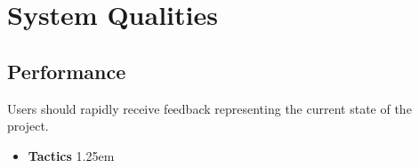 \documentclass{article}
\newcommand{\indentsize}{1.25em}
\newcommand{\pbodyitem}[2]{
    \item \textbf{{#1}} {
    \parindent \indentsize \newline {#2}
}
}
\begin{document}
\section{System Qualities}{
  \label{sec:qualityattributes}
  \subsection{Performance}
Users should rapidly receive feedback representing the current state of the project.
  \begin{itemize}
    \pbodyitem{Tactics}{
      


}
\end{itemize}}
\end{document}

